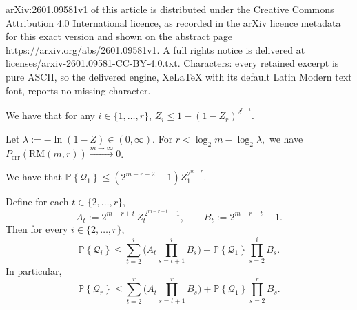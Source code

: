\documentclass[10pt,a4paper]{amsart}
\newcommand{\PR}[1]{{\mathbb{P}}\left\{ #1\right\}}
\newcommand{\cQ}{\ensuremath{\mathcal{Q}}}
\begin{document}
arXiv:2601.09581v1 of this article is distributed under the Creative Commons Attribution 4.0 International licence, as recorded in the arXiv licence metadata for this exact version and shown on the abstract page https://arxiv.org/abs/2601.09581v1. A full rights notice is delivered at licenses/arxiv-2601.09581-CC-BY-4.0.txt. Characters: every retained excerpt is pure ASCII, so the delivered engine, XeLaTeX with its default Latin Modern text font, reports no missing character.
\begin{lemma}\label{lem:bhat-unroll}
We have that for any $i\in \{1,\ldots,r\}$, $ Z_i  \leq 1- (1- Z_r)^{2^{r-i}}$.
\end{lemma}

\begin{theorem}\label{thm:main}
Let
$
\lambda := -\ln(1-Z)\in(0,\infty).
$
For
$
r < \log_2 m -\log_2 \lambda,
$
we have $P_\text{err}(\text{RM}(m,r))\xrightarrow{m\to \infty} 0$.
\end{theorem}

\begin{lemma}\label{lem:Q1}
     We have that
$
        \PR{ \cQ_1}  \leq (2 ^ { m -r + 2  } - 1 ) Z_1^{2^{m-r}}.
$

\end{lemma}

\begin{lemma}\label{lem:Qi-unroll}
Define for each $t\in\{2,\dots,r\}$,
\[
A_t := 2^{m-r+t}\, Z_t^{\,2^{m-r+t}-1},
\qquad
B_t := 2^{m-r+t}-1.
\]
Then for every $i\in\{2,\dots,r\}$,
\begin{equation*}\label{eq:Qi-unrolled}
\PR{\cQ_i}
\le
\sum_{t=2}^{i}\Bigg( A_t \prod_{s=t+1}^{i} B_s \Bigg)
+
\PR{\cQ_1}\prod_{s=2}^{i} B_s .
\end{equation*}
In particular, 
\begin{equation*}\label{eq:Qr-unrolled}
\PR{\cQ_r}
\le
\sum_{t=2}^{r}\Bigg( A_t \prod_{s=t+1}^{r} B_s \Bigg)
+
\PR{\cQ_1}\prod_{s=2}^{r} B_s .
\end{equation*}
\end{lemma}
\end{document}
